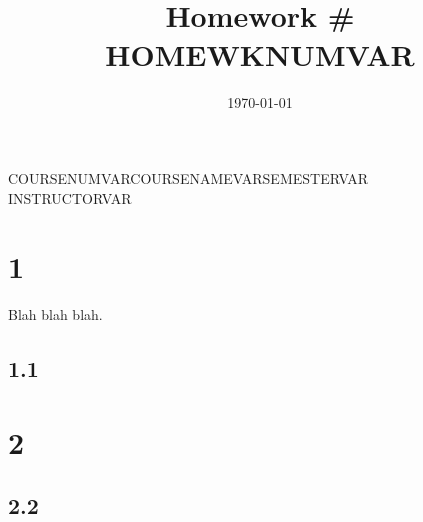 \documentclass[12pt, letterpaper]{extarticle}
\title{Homework \# HOMEWKNUMVAR}
\author{\yourName}
\date{\today}
\newcommand{\classNumber}{COURSENUMVAR}
\newcommand{\instructor}{INSTRUCTORVAR}
\newcommand{\className}{COURSENAMEVAR}
\newcommand{\semester}{SEMESTERVAR}
\begin{document}
\begin{titlepage}
\maketitle
\centering
\vspace{2.5cm}
\classNumber \qquad \className \qquad \semester\\
\vspace{0.5cm}
\instructor
\thispagestyle{empty}
\end{titlepage}

\section{1}

Blah blah blah.

\subsection{1.1}

\section{2}

\subsection{2.2}
\end{document}
